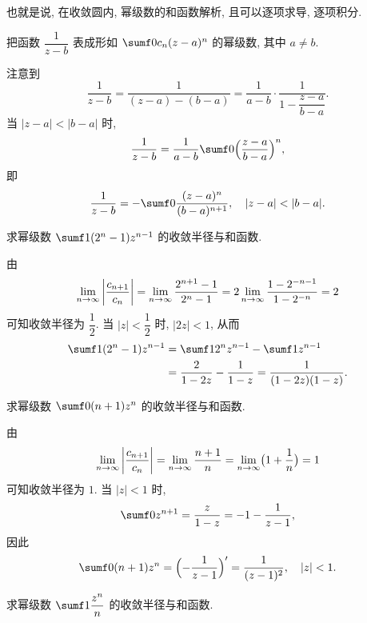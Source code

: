 也就是说, \alert{在收敛圆内, 幂级数的和函数解析, 且可以逐项求导, 逐项积分}.

\begin{example}
  把函数 $\dfrac1{z-b}$ 表成形如 $\sumf0 c_n(z-a)^n$ 的幂级数, 其中 $a\neq b$.
\end{example}

\begin{solution}
  注意到
  \[
     \frac1{z-b}
    =\frac1{(z-a)-(b-a)}
    =\frac1{a-b}\cdot\frac1{1-\dfrac{z-a}{b-a}}.
  \]
  当 $|z-a|<|b-a|$ 时,
  \[
     \frac1{z-b}
    =\frac1{a-b}\sumf0 \Bigl(\frac{z-a}{b-a}\Bigr)^n,
  \]
  即
  \[
     \frac1{z-b}
    =-\sumf0 \frac{(z-a)^n}{(b-a)^{n+1}},
      \quad|z-a|<|b-a|.
  \]
\end{solution}

\begin{example}
  求幂级数 $\sumf1 (2^n-1)z^{n-1}$ 的收敛半径与和函数.
\end{example}

\begin{solution}
  由
  \[
     \lim_{n\rightarrow\infty}\left|\frac{c_{n+1}}{c_n}\right|
    =\lim_{n\rightarrow\infty}\frac{2^{n+1}-1}{2^n-1}
    =2\lim_{n\rightarrow\infty}\frac{1-2^{-n-1}}{1-2^{-n}}
    =2
  \]
  可知收敛半径为 $\dfrac12$.
  当 $|z|<\dfrac12$ 时, $|2z|<1$, 从而
  \begin{align*}
     \sumf1 (2^n-1)z^{n-1}&
    =\sumf1 2^n z^{n-1}-\sumf1 z^{n-1}\\&
    =\frac2{1-2z}-\frac1{1-z}
    =\frac1{(1-2z)(1-z)}.
  \end{align*}
\end{solution}

\begin{example}
  求幂级数 $\sumf0 (n+1)z^n$ 的收敛半径与和函数.
\end{example}

\begin{solution}
  由
  \[
     \lim_{n\rightarrow\infty}\left|\frac{c_{n+1}}{c_n}\right|
    =\lim_{n\rightarrow\infty}\frac{n+1}n
    =\lim_{n\rightarrow\infty}\bigl(1+\frac1n\bigr)
    =1
  \]
  可知收敛半径为 $1$.
  当 $|z|<1$ 时,
  \[
     \sumf0 z^{n+1}
    =\frac z{1-z}
    =-1-\frac1{z-1},
  \]
  因此
  \[
     \sumf0 (n+1)z^n
    =\Bigl(-\frac1{z-1}\Bigr)'
    =\frac1{(z-1)^2},
      \quad |z|<1.
  \]
\end{solution}

\begin{exercise}
  求幂级数 $\sumf1 \dfrac{z^n}n$ 的收敛半径与和函数.
\end{exercise}

